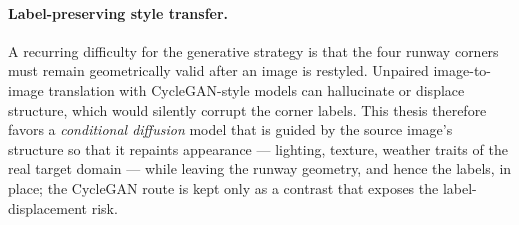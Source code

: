 \paragraph{Label-preserving style transfer.}
A recurring difficulty for the generative strategy is that the four runway corners
must remain geometrically valid after an image is restyled. Unpaired image-to-image
translation with CycleGAN-style models can hallucinate or displace structure, which
would silently corrupt the corner labels. This thesis therefore favors a
\emph{conditional diffusion} model that is guided by the source image's structure so
that it repaints appearance --- lighting, texture, weather traits of the real target
domain --- while leaving the runway geometry, and hence the labels, in place; the
CycleGAN route is kept only as a contrast that exposes the label-displacement risk.

